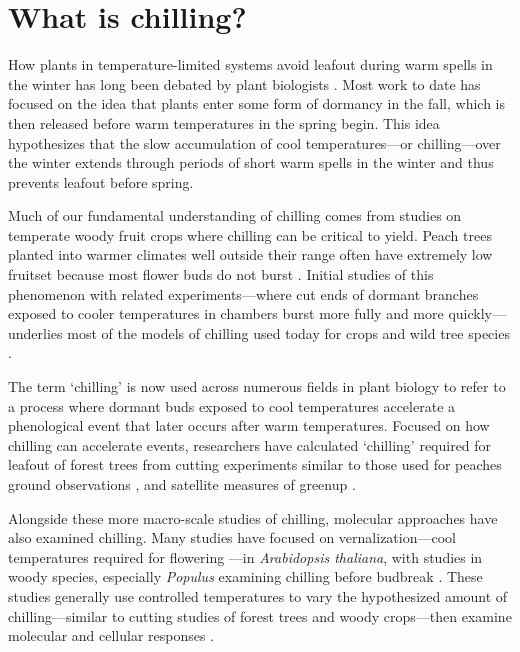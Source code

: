 \documentclass[11pt]{article}
\begin{document}
\section*{What is chilling?}

How plants in temperature-limited systems avoid leafout during warm spells in the winter has long been debated by plant biologists \citep[e.g.,][]{lamb1948effect,weinberger}. Most work to date has focused on the idea that plants enter some form of dormancy in the fall, which is then released before warm temperatures in the spring begin. This idea hypothesizes that the slow accumulation of cool temperatures---or chilling---over the winter extends through periods of short warm spells in the winter and thus prevents leafout before spring. 

Much of our fundamental understanding of chilling comes from studies on temperate woody fruit crops where chilling can be critical to yield. Peach trees planted into warmer climates well outside their range often have extremely low fruitset because most flower buds do not burst \citep{weinberger,overcash1955effects,erez1971improved}. Initial studies of this phenomenon with related experiments---where cut ends of dormant branches exposed to cooler temperatures in chambers burst more fully and more quickly---underlies most of the models of chilling used today for crops and wild tree species \citep[][]{weinberger,ospreebbms}. %

The term `chilling' is now used across numerous fields in plant biology to refer to a process where dormant buds exposed to cool temperatures accelerate a phenological event that later occurs after warm temperatures. Focused on how chilling can accelerate events, researchers have calculated `chilling' required for leafout of forest trees from cutting experiments similar to those used for peaches \citep[reviewed in][]{ospreebbms}ground observations \citep{Luedeling2009}, and satellite measures of greenup \citep{kaduk2011predicting}.  %

Alongside these more macro-scale studies of chilling, molecular approaches have also examined chilling. Many studies have focused on vernalization---cool temperatures required for flowering \citep{kim2009vernalization}---in \emph{Arabidopsis thaliana}, with studies in woody species, especially \emph{Populus} examining chilling before budbreak \citep[][]{azeez2021early,cai2024molecular}. These studies generally use controlled temperatures to vary the hypothesized amount of chilling---similar to cutting studies of forest trees and woody crops---then examine molecular and cellular responses \citep[e.g.,][]{pan2021aba,azeez2021early,cai2024molecular}.
\end{document}
